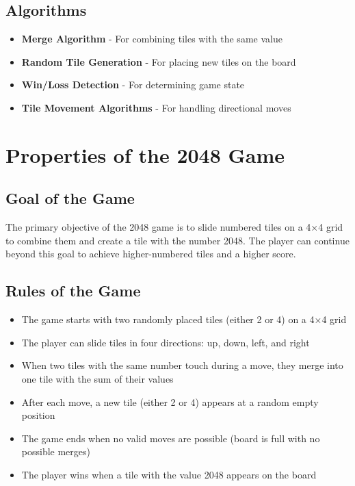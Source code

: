 \documentclass[12pt, a4paper]{article}
\begin{document}
\subsection{Algorithms}
\begin{itemize}
    \item \textbf{Merge Algorithm} - For combining tiles with the same value
    \item \textbf{Random Tile Generation} - For placing new tiles on the board
    \item \textbf{Win/Loss Detection} - For determining game state
    \item \textbf{Tile Movement Algorithms} - For handling directional moves
\end{itemize}

\section{Properties of the 2048 Game}

\subsection{Goal of the Game}
The primary objective of the 2048 game is to slide numbered tiles on a 4×4 grid to combine them and create a tile with the number 2048. The player can continue beyond this goal to achieve higher-numbered tiles and a higher score.

\subsection{Rules of the Game}
\begin{itemize}
    \item The game starts with two randomly placed tiles (either 2 or 4) on a 4×4 grid
    \item The player can slide tiles in four directions: up, down, left, and right
    \item When two tiles with the same number touch during a move, they merge into one tile with the sum of their values
    \item After each move, a new tile (either 2 or 4) appears at a random empty position
    \item The game ends when no valid moves are possible (board is full with no possible merges)
    \item The player wins when a tile with the value 2048 appears on the board
\end{itemize}
\end{document}
